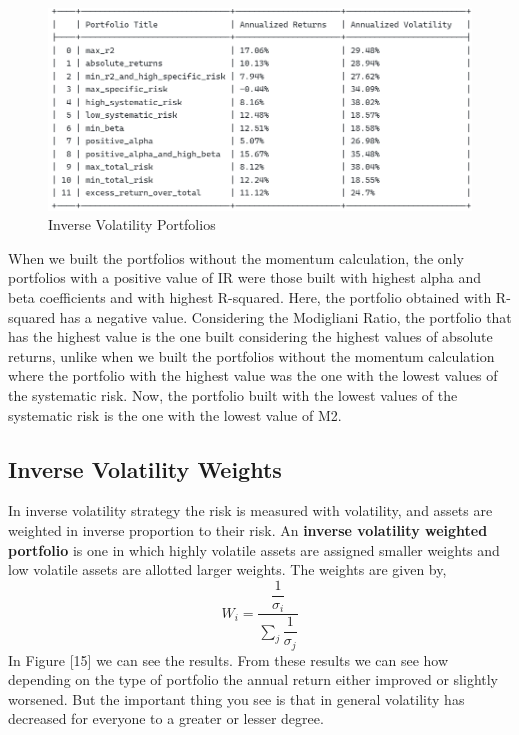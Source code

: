 \documentclass[twocolumn]{article}
\begin{document}
\begin{figure}[b]
\centering\includegraphics[scale=0.7]{newWeights.png}
\caption{Inverse Volatility Portfolios}
\end{figure}
When we built the portfolios without the momentum calculation, the only portfolios with a positive value of IR were those built with highest alpha and beta coefficients and with highest R-squared. Here, the portfolio obtained with R-squared has a negative value. Considering the Modigliani Ratio, the portfolio that has the highest value is the one built considering the highest values of absolute returns, unlike when we built the portfolios without the momentum calculation where the portfolio with the highest value was the one with the lowest values of the systematic risk. Now, the portfolio built with the lowest values of the systematic risk is the one with the lowest value of M2.
\subsection{Inverse Volatility Weights}
In inverse volatility strategy the risk is measured with volatility, and assets are weighted in inverse proportion to their risk. An \textbf{inverse volatility weighted portfolio} is one in which highly volatile assets are assigned smaller weights and low volatile assets are allotted larger weights. The weights are given by,
\begin{equation}
W_i = \dfrac{\dfrac{1}{\sigma_i}}{\sum_j \dfrac{1}{\sigma_j}}
\end{equation}
In Figure [15] we can see the results. From these results we can see how depending on the type of portfolio the annual return either improved or slightly worsened. But the important thing you see is that in general volatility has decreased for everyone to a greater or lesser degree.
\end{document}
